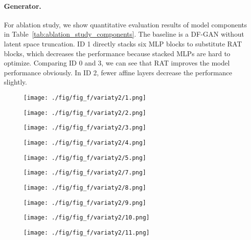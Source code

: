 \documentclass{article}
\begin{document}
	\paragraph{Generator.}For ablation study, we show quantitative evaluation results of model components in Table~\ref{tab:ablation_study_components}. 
	The baseline is a DF-GAN without latent space truncation. ID 1 directly stacks six MLP blocks to substitute RAT blocks, which decreases the performance because stacked MLPs are hard to optimize. Comparing ID 0 and 3, we can see that RAT improves the model performance obviously. In ID 2, fewer affine layers decrease the performance slightly. 
	
\begin{figure}[b]
	\centering
	
	\begin{minipage}[c]{0.01\textwidth}
		\fontsize{2.0pt}{0.5\baselineskip}\selectfont \center{\ } 
	\end{minipage}
	
	\begin{minipage}{0.091\textwidth}\texttt{[image: ./fig/fig\_f/variaty2/1.png]}
	\end{minipage}
	\begin{minipage}{0.091\textwidth}
		\texttt{[image: ./fig/fig\_f/variaty2/2.png]}
	\end{minipage}
	\begin{minipage}{0.091\textwidth}
		\texttt{[image: ./fig/fig\_f/variaty2/3.png]}
	\end{minipage}
	\begin{minipage}{0.091\textwidth}
		\texttt{[image: ./fig/fig\_f/variaty2/4.png]}
	\end{minipage}
	\begin{minipage}{0.091\textwidth}
		\texttt{[image: ./fig/fig\_f/variaty2/5.png]}
	\end{minipage}


		\begin{minipage}{0.091\textwidth}\texttt{[image: ./fig/fig\_f/variaty2/7.png]}
	\end{minipage}
	\begin{minipage}{0.091\textwidth}
		\texttt{[image: ./fig/fig\_f/variaty2/8.png]}
	\end{minipage}
	\begin{minipage}{0.091\textwidth}
		\texttt{[image: ./fig/fig\_f/variaty2/9.png]}
	\end{minipage}
	\begin{minipage}{0.091\textwidth}
		\texttt{[image: ./fig/fig\_f/variaty2/10.png]}
	\end{minipage}
	\begin{minipage}{0.091\textwidth}
		\texttt{[image: ./fig/fig\_f/variaty2/11.png]}
	\end{minipage}
\begin{minipage}[t]{0.5\textwidth}
	\end{minipage}


\end{figure}
\end{document}

